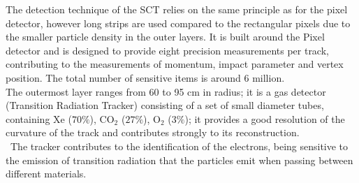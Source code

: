 The detection technique of the SCT relies on the same principle as for the pixel detector, however long strips are used compared to the rectangular pixels due to 
the smaller particle density in the outer layers.
It is built around the Pixel detector and is designed to provide eight precision measurements per track, contributing to the measurements of momentum, impact parameter and 
vertex position. The total number of sensitive items is around 6 million.
\vspace{\baselineskip}
\\The outermost layer ranges from 60 to 95 cm in radius; it is a gas detector (Transition Radiation Tracker) consisting of a set of small diameter tubes, containing $\mathrm{Xe}$ ($\mathrm{70\%}$), 
$\mathrm{CO_2}$ ($\mathrm{27\%}$),  $\mathrm{O_2}$ ($\mathrm{3\%}$); it provides a good resolution of the curvature of the track and contributes strongly to its reconstruction.\\\
The tracker contributes to the identification of the electrons, being sensitive to the emission of transition radiation that the particles emit when passing between different materials. 

